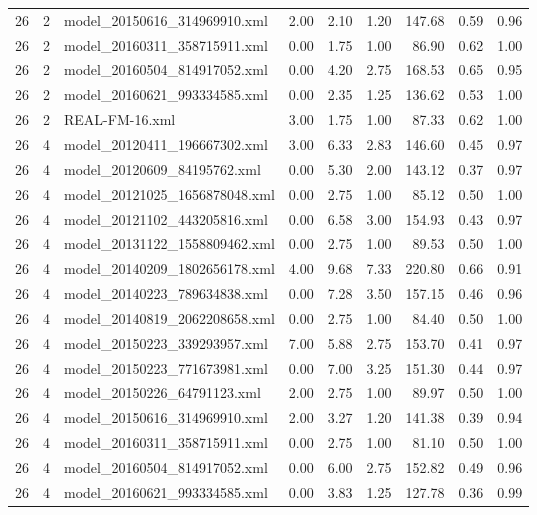 \begin{table}[ht]
\begin{tabular}{rrlrrrrrr}
   26 &   2 & model\_20150616\_314969910.xml & 2.00 & 2.10 & 1.20 & 147.68 & 0.59 & 0.96 \\ 
   26 &   2 & model\_20160311\_358715911.xml & 0.00 & 1.75 & 1.00 & 86.90 & 0.62 & 1.00 \\ 
   26 &   2 & model\_20160504\_814917052.xml & 0.00 & 4.20 & 2.75 & 168.53 & 0.65 & 0.95 \\ 
   26 &   2 & model\_20160621\_993334585.xml & 0.00 & 2.35 & 1.25 & 136.62 & 0.53 & 1.00 \\ 
   26 &   2 & REAL-FM-16.xml & 3.00 & 1.75 & 1.00 & 87.33 & 0.62 & 1.00 \\ 
   26 &   4 & model\_20120411\_196667302.xml & 3.00 & 6.33 & 2.83 & 146.60 & 0.45 & 0.97 \\ 
   26 &   4 & model\_20120609\_84195762.xml & 0.00 & 5.30 & 2.00 & 143.12 & 0.37 & 0.97 \\ 
   26 &   4 & model\_20121025\_1656878048.xml & 0.00 & 2.75 & 1.00 & 85.12 & 0.50 & 1.00 \\ 
   26 &   4 & model\_20121102\_443205816.xml & 0.00 & 6.58 & 3.00 & 154.93 & 0.43 & 0.97 \\ 
   26 &   4 & model\_20131122\_1558809462.xml & 0.00 & 2.75 & 1.00 & 89.53 & 0.50 & 1.00 \\ 
   26 &   4 & model\_20140209\_1802656178.xml & 4.00 & 9.68 & 7.33 & 220.80 & 0.66 & 0.91 \\ 
   26 &   4 & model\_20140223\_789634838.xml & 0.00 & 7.28 & 3.50 & 157.15 & 0.46 & 0.96 \\ 
   26 &   4 & model\_20140819\_2062208658.xml & 0.00 & 2.75 & 1.00 & 84.40 & 0.50 & 1.00 \\ 
   26 &   4 & model\_20150223\_339293957.xml & 7.00 & 5.88 & 2.75 & 153.70 & 0.41 & 0.97 \\ 
   26 &   4 & model\_20150223\_771673981.xml & 0.00 & 7.00 & 3.25 & 151.30 & 0.44 & 0.97 \\ 
   26 &   4 & model\_20150226\_64791123.xml & 2.00 & 2.75 & 1.00 & 89.97 & 0.50 & 1.00 \\ 
   26 &   4 & model\_20150616\_314969910.xml & 2.00 & 3.27 & 1.20 & 141.38 & 0.39 & 0.94 \\ 
   26 &   4 & model\_20160311\_358715911.xml & 0.00 & 2.75 & 1.00 & 81.10 & 0.50 & 1.00 \\ 
   26 &   4 & model\_20160504\_814917052.xml & 0.00 & 6.00 & 2.75 & 152.82 & 0.49 & 0.96 \\ 
   26 &   4 & model\_20160621\_993334585.xml & 0.00 & 3.83 & 1.25 & 127.78 & 0.36 & 0.99 \\ 

\end{tabular}
\end{table}
